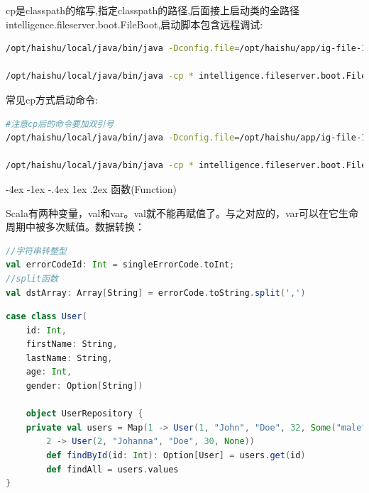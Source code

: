 \documentclass[12pt]{book}
\makeatletter
\numberwithin{dummy}{section}
\theoremstyle{ocrenumbox}
\theoremstyle{blacknumex}
\theoremstyle{blacknumbox}
\theoremstyle{ocrenum}
\renewcommand{\section}{\@startsection{section}{1}{\z@}
	{-4ex \@plus -1ex \@minus -.4ex}
	{1ex \@plus.2ex }
	{\normalfont\large\sffamily\bfseries}}
\makeatother
\begin{document}
cp是classpath的缩写,指定classpath的路径,后面接上启动类的全路径intelligence.fileserver.boot.FileBoot,启动脚本包含远程调试:

\begin{lstlisting}[language=Bash]
/opt/haishu/local/java/bin/java -Dconfig.file=/opt/haishu/app/ig-file-1.0.0/bin/../conf/application.conf -Dpidfile.path=/opt/haishu/app/ig-file-1.0.0/bin/../run/ig-file.pid -Dlogback.configurationFile=/opt/haishu/app/ig-file-1.0.0/bin/../conf/logback.xml -cp /opt/haishu/app/ig-file-1.0.0/lib/* intelligence.fileserver.boot.FileBoot -Xms2G -Xmx4G -Xdebug -Xrunjdwp:transport=dt_socket,suspend=n,server=y,address=5006

/opt/haishu/local/java/bin/java -cp * intelligence.fileserver.boot.FileBoot
\end{lstlisting}


常见cp方式启动命令:

\begin{lstlisting}[language=Bash]
#注意cp后的命令要加双引号
/opt/haishu/local/java/bin/java -Dconfig.file=/opt/haishu/app/ig-file-1.0.0/bin/../conf/application.conf -Dpidfile.path=/opt/haishu/app/ig-file-1.0.0/bin/../run/ig-file.pid -Dlogback.configurationFile=/opt/haishu/app/ig-file-1.0.0/bin/../conf/logback.xml -cp "/opt/haishu/app/ig-file-1.0.0/lib/*" intelligence.fileserver.boot.FileBoot -Xms2G -Xmx4G -Xdebug -Xrunjdwp:transport=dt_socket,suspend=n,server=y,address=5006

/opt/haishu/local/java/bin/java -cp * intelligence.fileserver.boot.FileBoot
\end{lstlisting}



\section{函数(Function)}

Scala有两种变量，val和var。val就不能再赋值了。与之对应的，var可以在它生命周期中被多次赋值。数据转换：

\begin{lstlisting}[language=Scala]
//字符串转整型
val errorCodeId: Int = singleErrorCode.toInt;
//split函数
val dstArray: Array[String] = errorCode.toString.split(',')
\end{lstlisting}


\begin{lstlisting}[language=Scala]
case class User(  
	id: Int,  
	firstName: String,  
	lastName: String,  
	age: Int,  
	gender: Option[String])  
	
	object UserRepository {  
	private val users = Map(1 -> User(1, "John", "Doe", 32, Some("male")),  
		2 -> User(2, "Johanna", "Doe", 30, None))  
		def findById(id: Int): Option[User] = users.get(id)  
		def findAll = users.values  
}  
\end{lstlisting}
\end{document}
